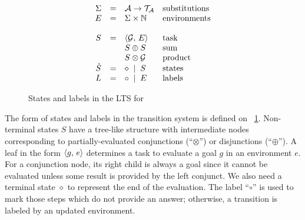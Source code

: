 \begin{figure}[t]
\centering
\[
\begin{array}{ccll}
  \Sigma & = & \mathcal{A} \to \mathcal{T}_\mathcal{A} & \mbox{substitutions} \\
  E & = & \Sigma \times \mathbb{N} & \mbox{environments} \\
  \\
  S & = & \langle \mathcal{G} ,\, E \rangle & \mbox{task} \\
    &   & S \oplus S & \mbox{sum} \\
    &   & S \otimes \mathcal{G} & \mbox{product} \\
  \hat{S} & = & \diamond \; \mid \; S & \mbox{states} \\
  L & = & \circ \; \mid \; E & \mbox{labels} \\
\end{array}
\]
\caption{States and labels in the LTS for \mK}
\label{fig:operanional_semantics_states_labels}
\end{figure}

The form of states and labels in the transition system is defined on \figureword~\ref{fig:operanional_semantics_states_labels}.
Non-terminal states $S$ have a tree-like structure with intermediate nodes corresponding to partially-evaluated conjunctions
(``$\otimes$'') or disjunctions (``$\oplus$'').
A leaf in the form $\langle g ,\, e \rangle$ determines a task to evaluate a goal $g$ in an environment $e$. For a conjunction node, its right child
is always a goal since it cannot be evaluated unless some result is provided by the left conjunct.
We also need a terminal state $\diamond$ to represent the end of the evaluation.
The label ``$\circ$'' is used to mark those steps which do not provide an answer; otherwise, a transition is labeled by an updated
environment.

